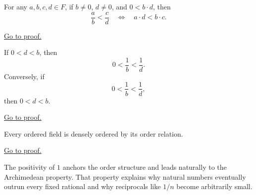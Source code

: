 \begin{theorem}
\label{thm:fraction-order-comparison-positive-denominator-product}
For any $a,b,c,d\in F$, if $b\neq 0$, $d\neq 0$, and $0<b\cdot d$, then
\[
\frac{a}{b}<\frac{c}{d}
\quad\Longleftrightarrow\quad
a\cdot d<b\cdot c.
\]
\end{theorem}

\begin{remark*}[Proof]
\hyperref[prf:fraction-order-comparison-positive-denominator-product]{Go to proof.}
\end{remark*}

\begin{theorem}
\label{thm:reciprocal-order-for-positive-elements}
If $0<d<b$, then
\[
0<\frac{1}{b}<\frac{1}{d}.
\]
Conversely, if
\[
0<\frac{1}{b}<\frac{1}{d},
\]
then $0<d<b$.
\end{theorem}

\begin{remark*}[Proof]
\hyperref[prf:reciprocal-order-for-positive-elements]{Go to proof.}
\end{remark*}

\begin{theorem}
\label{thm:ordered-fields-are-densely-ordered}
Every ordered field is densely ordered by its order relation.
\end{theorem}

\begin{remark*}[Proof]
\hyperref[prf:ordered-fields-are-densely-ordered]{Go to proof.}
\end{remark*}

\begin{remark}[Transition]
\label{rem:arch-v-complete}
The positivity of $1$ anchors the order structure and leads naturally to
the Archimedean property. That property explains why natural numbers
eventually outrun every fixed rational and why reciprocals like $1/n$
become arbitrarily small.
\end{remark}

